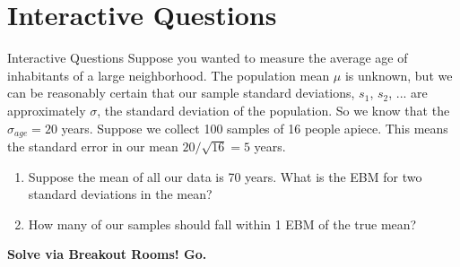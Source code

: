 \documentclass{beamer}
\begin{document}
\section{Interactive Questions}

\begin{frame}{Interactive Questions}
Suppose you wanted to measure the average age of inhabitants of a large neighborhood.  The population mean $\mu$ is unknown, but we can be reasonably certain that our sample standard deviations, $s_1$, $s_2$, ... are approximately $\sigma$, the standard deviation of the population.  So we know that the $\sigma_{age} = 20$ years.  Suppose we collect 100 samples of 16 people apiece.  This means the standard error in our mean $20/\sqrt{16} = 5$ years. \\
\begin{enumerate}
\item Suppose the mean of all our data is 70 years.  What is the EBM for two standard deviations in the mean?
\item How many of our samples should fall within 1 EBM of the true mean?
\end{enumerate}
\textbf{\alert{Solve via Breakout Rooms!  Go.}}
\end{frame}
\end{document}
